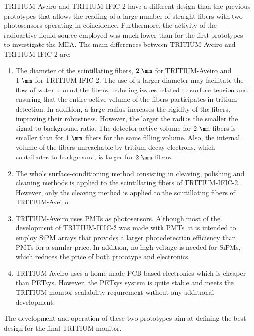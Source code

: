 TRITIUM-Aveiro and TRITIUM-IFIC-2 have a different design than the previous prototypes that allows the reading of a large number of straight fibers with two photosensors operating in coincidence. Furthermore, the activity of the radioactive liquid source employed was much lower than for the first prototypes to investigate the MDA. The main differences between TRITIUM-Aveiro and TRITIUM-IFIC-2 are:

\begin{enumerate}

\item{} The diameter of the scintillating fibers, $2~\mm$ for TRITIUM-Aveiro and $1~\mm$ for TRITIUM-IFIC-2. The use of a larger diameter may facilitate the flow of water around the fibers, reducing issues related to surface tension and ensuring that the entire active volume of the fibers participates in tritium detection. In addition, a large radius increases the rigidity of the fibers, improving their robustness. However, the larger the radius the smaller the signal-to-background ratio. The detector active volume for $2~\mm$ fibers is smaller than for $1~\mm$ fibers for the same filling volume. Also, the internal volume of the fibers unreachable by tritium decay electrons, which contributes to background, is larger for $2~\mm$ fibers.


\item{} The whole surface-conditioning method consisting in cleaving, polishing and cleaning methods is applied to the scintillating fibers of TRITIUM-IFIC-2. However, only the cleaving method is applied to the scintillating fibers of TRITIUM-Aveiro.

\item{} TRITIUM-Aveiro uses PMTs as photosensors. Although most of the development of TRITIUM-IFIC-2 was made with PMTs, it is intended to employ SiPM arrays that provides a larger photodetection efficiency than PMTs for a similar price. In addition, no high voltage is needed for SiPMs, which reduces the price of both prototype and electronics.

\item{} TRITIUM-Aveiro uses a home-made PCB-based electronics which is cheaper than PETsys. However, the PETsys system is quite stable and meets the TRITIUM monitor scalability requirement without any additional development.

\end{enumerate}

The development and operation of these two prototypes aim at defining the best design for the final TRITIUM monitor.
